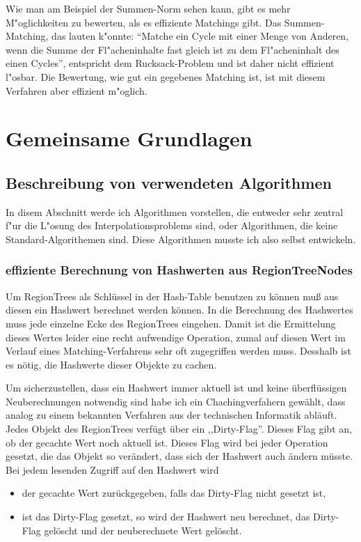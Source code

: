 Wie man am Beispiel der Summen-Norm sehen kann, gibt es mehr M"oglichkeiten zu bewerten, als es effiziente Matchings gibt. Das Summen-Matching, das lauten k"onnte: "`Matche ein Cycle mit  einer Menge von Anderen, wenn die Summe der Fl"acheninhalte fast gleich ist zu dem Fl"acheninhalt des einen Cycles"', entspricht dem Rucksack-Problem und ist daher nicht effizient l"osbar. Die Bewertung, wie gut ein gegebenes Matching ist, ist mit diesem Verfahren aber effizient m"oglich.

\section{Gemeinsame Grundlagen }

\subsection{Beschreibung von verwendeten Algorithmen} \label{Algorithmen}
In disem Abschnitt werde ich Algorithmen vorstellen, die entweder sehr zentral f"ur die L"osung des Interpolationsproblems sind, oder Algorithmen, die keine Standard-Algorithemen sind. Diese Algorithmen musste ich also selbst entwickeln.

\subsubsection{effiziente Berechnung von Hashwerten aus RegionTreeNodes}\label{berechenHashwerte}

Um RegionTrees als Schlüssel in der Hash-Table benutzen zu können muß aus diesen ein Hashwert berechnet werden können. In die Berechnung des Hashwertes muss jede einzelne Ecke des RegionTrees eingehen. Damit ist die Ermittelung dieses Wertes leider eine recht aufwendige Operation, zumal auf diesen Wert im Verlauf eines Matching-Verfahrens sehr oft zugegriffen werden muss. Desshalb ist es nötig, die Hashwerte dieser Objekte zu cachen. 

Um sicherzustellen, dass ein Hashwert immer aktuell ist und keine überflüssigen Neuberechnungen notwendig sind habe ich ein Chachingverfahern gewählt, dass analog zu einem bekannten Verfahren aus der technischen Informatik abläuft. Jedes Objekt des RegionTrees verfügt über ein ,,Dirty-Flag''. Dieses Flag gibt an, ob der gecachte Wert noch aktuell ist. Dieses Flag wird bei jeder Operation gesetzt, die das Objekt so verändert, dass sich der Hashwert auch ändern müsste. Bei jedem lesenden Zugriff auf den Hashwert wird 
\begin{itemize}
\item der gecachte Wert zurückgegeben, falls das Dirty-Flag nicht gesetzt ist,
\item ist das Dirty-Flag gesetzt, so wird der Hashwert neu berechnet, das Dirty-Flag gelöscht und der neuberechnete Wert gelöscht.
\end{itemize}

